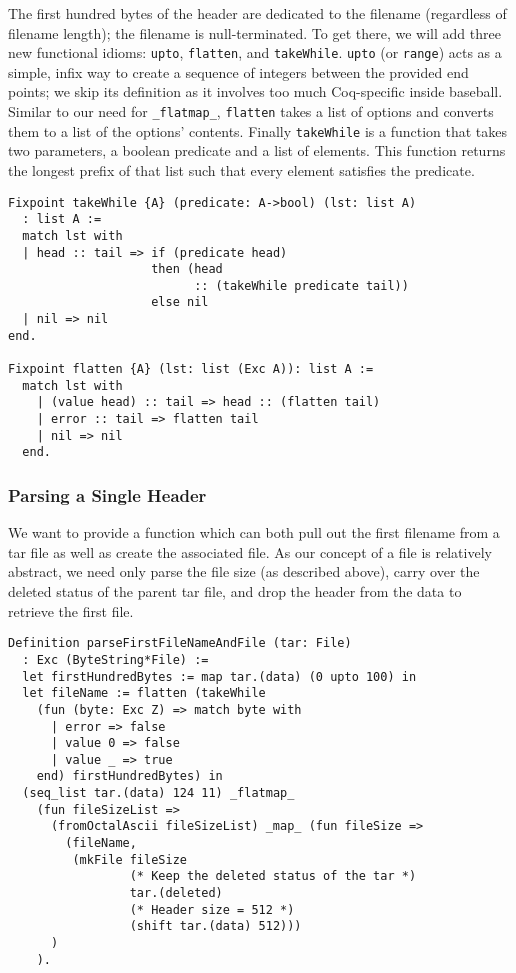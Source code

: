 \documentclass[nocopyrightspace]{sigplanconf}
\begin{document}
The first hundred bytes of the header are dedicated to the filename
(regardless of filename length); the filename is null-terminated. To get
there, we will add three new functional idioms: {\tt upto}, {\tt flatten}, and
{\tt takeWhile}. {\tt upto} (or {\tt range}) acts as a simple, infix way to
create a sequence of integers between the provided end points; we skip its
definition as it involves too much Coq-specific inside baseball. Similar to
our need for {\tt \_flatmap\_}, {\tt flatten} takes a list of options and
converts them to a list of the options' contents. Finally {\tt takeWhile} is a
function that takes two parameters, a boolean predicate and a list of
elements. This function returns the longest prefix of that list such that
every element satisfies the predicate.

\begin{lstlisting}
Fixpoint takeWhile {A} (predicate: A->bool) (lst: list A)
  : list A :=
  match lst with
  | head :: tail => if (predicate head) 
                    then (head 
                          :: (takeWhile predicate tail))
                    else nil
  | nil => nil
end.

Fixpoint flatten {A} (lst: list (Exc A)): list A :=
  match lst with
    | (value head) :: tail => head :: (flatten tail)
    | error :: tail => flatten tail
    | nil => nil
  end.
\end{lstlisting}

\subsubsection{Parsing a Single Header}
We want to provide a function which can both pull out the first filename from
a tar file as well as create the associated file. As our concept of a file is
relatively abstract, we need only parse the file size (as described above),
carry over the deleted status of the parent tar file, and drop the header from
the data to retrieve the first file.

\begin{lstlisting}
Definition parseFirstFileNameAndFile (tar: File)
  : Exc (ByteString*File) :=
  let firstHundredBytes := map tar.(data) (0 upto 100) in
  let fileName := flatten (takeWhile 
    (fun (byte: Exc Z) => match byte with
      | error => false
      | value 0 => false
      | value _ => true
    end) firstHundredBytes) in
  (seq_list tar.(data) 124 11) _flatmap_ 
    (fun fileSizeList =>
      (fromOctalAscii fileSizeList) _map_ (fun fileSize =>
        (fileName, 
         (mkFile fileSize
                 (* Keep the deleted status of the tar *)
                 tar.(deleted)  
                 (* Header size = 512 *)
                 (shift tar.(data) 512)))
      )
    ).
\end{lstlisting}
\end{document}
